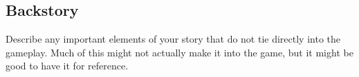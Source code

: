 \subsection{Backstory}%
Describe any important elements of your story that do not tie directly into the
gameplay. Much of this might not actually make it into the game, but it might be
good to have it for reference.


